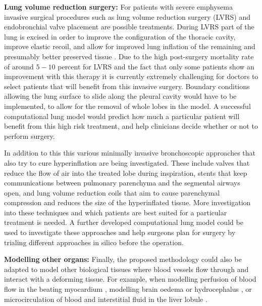 \noindent \textbf{Lung volume reduction surgery:} For patients with severe emphysema invasive surgical procedures such as lung volume reduction surgery (LVRS) and endobronchial valve placement are possible treatments. During LVRS part of the lung is excised in order to improve the configuration of the thoracic cavity, improve elastic recoil, and allow for improved lung inflation of the remaining and presumably better preserved tissue \citep{criner2011national}. Due to the high post-surgery mortality rate of around $5-10$ percent for LVRS and the fact that only some patients show an improvement with this therapy it is currently extremely challenging for doctors to select patients that will benefit from this invasive surgery. Boundary conditions allowing the lung surface to slide along the pleural cavity would have to be implemented, to allow for the removal of whole lobes in the model. A successful computational lung model would predict how much a particular patient will benefit from this high risk treatment, and help clinicians decide whether or not to perform surgery.

In addition to this this various minimally invasive bronchoscopic approaches that also try to cure hyperinflation are being investigated. These include valves that reduce the flow of air into the treated lobe during inspiration, stents that keep communications between pulmonary parenchyma and the segmental airways open, and lung volume reduction coils that aim to cause parenchymal compression and reduces the size of the hyperinflated tissue. More investigation into these techniques and which patients are best suited for a particular treatment is needed. A further developed computational lung model could be used to investigate these approaches and help surgeons plan for surgery by trialing different approaches in silico before the operation. \newline



\noindent \textbf{Modelling other organs:} Finally, the proposed methodology could also be adapted to model other biological tissues where blood vessels flow through and interact with a deforming tissue. For example, when modelling perfusion of blood flow in the beating myocardium \citep{chapelle2010poroelastic,cookson2011novel}, modelling brain oedema \citep{li2010three} or hydrocephalus \citep{wirth2006axisymmetric}, or microcirculation of blood and interstitial fluid in the liver lobule \citep{leungchavaphongse2013mathematical}.




